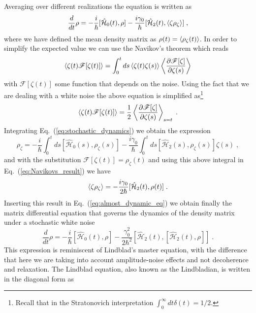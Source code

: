 Averaging over different realizations the equation is written as
\begin{equation}
	\frac{d}{dt}\rho=-\frac{i}{\hbar}[\hat{\mathcal{H}}_0(t),\rho]-\frac{i\gamma_0}{\hbar}[\hat{\mathcal{H}}_2(t),\expval{\zeta\rho_\zeta}]\; ,
	\label{eq:almost_dynamic_eq}
\end{equation}
where we have defined the mean density matrix as $\rho(t)=\expval{\rho_\zeta(t)}$. In order to simplify the expected value we can use the Navikov's theorem which reads
\begin{equation}
	\expval{\zeta(t)\mathscr{F}[\zeta(t)]}=\int_0^tds\expval{\zeta(t)\zeta(s)}\expval{\frac{\partial\mathscr{F}[\zeta]}{\partial\zeta(s)}}
\end{equation}
with $\mathscr{F}[\zeta(t)]$ some function that depends on the noise. Using the fact that we are dealing with a white noise the above equation is simplified as\footnote{Recall that in the Stratonovich interpretation $\int_0^\infty dt\delta (t)=1/2$.}
\begin{equation}
	\expval{\zeta(t)\mathscr{F}[\zeta(t)]}=\frac{1}{2}\expval{\frac{\partial\mathscr{F}[\zeta]}{\partial \zeta(s)}}_{s=t}\; .
	\label{eq:Navikovs_result}
\end{equation}
Integrating Eq.~(\ref{eq:stochastic_dynamics}) we obtain the expression
\begin{equation}
	\rho_\zeta=-\frac{i}{\hbar}\int_0^tds[\hat{\mathcal{H}}_0(s),\rho_\zeta(s)]-\frac{i\gamma_0}{\hbar}\int_0^tds[\hat{\mathcal{H}}_2(s),\rho_\zeta(s)]\zeta(s)\; ,
\end{equation}
and with the substitution $\mathscr{F}[\zeta(t)]=\rho_\zeta(t)$ and using this above integral in Eq.~(\ref{eq:Navikovs_result}) we have
\begin{equation}
	\expval{\zeta\rho_\zeta}=-\frac{i\gamma_0}{2\hbar}[\hat{\mathcal{H}}_2(t),\rho(t)]\; .
\end{equation}
Inserting this result in Eq.~(\ref{eq:almost_dynamic_eq}) we obtain finally the matrix differential equation that governs the dynamics of the density matrix under a stochastic white noise
\begin{equation}
	\frac{d}{dt}\rho=-\frac{i}{\hbar}[\hat{\mathcal{H}}_0(t),\rho]-\frac{\gamma_0^2}{2\hbar^2}[\hat{\mathcal{H}}_2(t),[\hat{\mathcal{H}}_2(t),\rho]]\; .
\end{equation}
This expression is reminiscent of Lindblad's master equation, with the difference that here we are taking into account amplitude-noise effects and not decoherence and relaxation. The Lindblad equation, also known as the Lindbladian, is written in the diagonal form as
